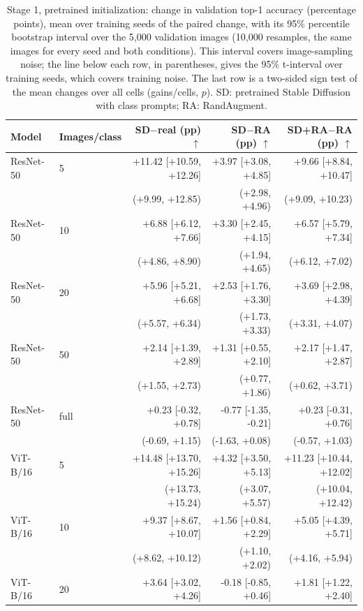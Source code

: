 \begin{table}[H]
\centering
\small
\setlength{\tabcolsep}{4pt}
\caption{Stage 1, pretrained initialization: change in validation top-1 accuracy (percentage points), mean over training seeds of the paired change, with its 95\% percentile bootstrap interval over the 5{,}000 validation images (10{,}000 resamples, the same images for every seed and both conditions). This interval covers image-sampling noise; the line below each row, in parentheses, gives the 95\% t-interval over training seeds, which covers training noise. The last row is a two-sided sign test of the mean changes over all cells (gains/cells, $p$). SD: pretrained Stable Diffusion with class prompts; RA: RandAugment.}
\label{tab:stage1-pretrained-bootstrap}
\begin{tabular}{llrrr}
\toprule
Model & Images/class & SD$-$real (pp) $\uparrow$ & SD$-$RA (pp) $\uparrow$ & SD+RA$-$RA (pp) $\uparrow$ \\
\midrule
ResNet-50 & 5 & +11.42 [+10.59, +12.26] & +3.97 [+3.08, +4.85] & +9.66 [+8.84, +10.47] \\
 & & (+9.99, +12.85) & (+2.98, +4.96) & (+9.09, +10.23) \\
ResNet-50 & 10 & +6.88 [+6.12, +7.66] & +3.30 [+2.45, +4.15] & +6.57 [+5.79, +7.34] \\
 & & (+4.86, +8.90) & (+1.94, +4.65) & (+6.12, +7.02) \\
ResNet-50 & 20 & +5.96 [+5.21, +6.68] & +2.53 [+1.76, +3.30] & +3.69 [+2.98, +4.39] \\
 & & (+5.57, +6.34) & (+1.73, +3.33) & (+3.31, +4.07) \\
ResNet-50 & 50 & +2.14 [+1.39, +2.89] & +1.31 [+0.55, +2.10] & +2.17 [+1.47, +2.87] \\
 & & (+1.55, +2.73) & (+0.77, +1.86) & (+0.62, +3.71) \\
ResNet-50 & full & +0.23 [-0.32, +0.78] & -0.77 [-1.35, -0.21] & +0.23 [-0.31, +0.76] \\
 & & (-0.69, +1.15) & (-1.63, +0.08) & (-0.57, +1.03) \\
\midrule
ViT-B/16 & 5 & +14.48 [+13.70, +15.26] & +4.32 [+3.50, +5.13] & +11.23 [+10.44, +12.02] \\
 & & (+13.73, +15.24) & (+3.07, +5.57) & (+10.04, +12.42) \\
ViT-B/16 & 10 & +9.37 [+8.67, +10.07] & +1.56 [+0.84, +2.29] & +5.05 [+4.39, +5.71] \\
 & & (+8.62, +10.12) & (+1.10, +2.02) & (+4.16, +5.94) \\
ViT-B/16 & 20 & +3.64 [+3.02, +4.26] & -0.18 [-0.85, +0.46] & +1.81 [+1.22, +2.40] \\

\end{tabular}
\end{table}
